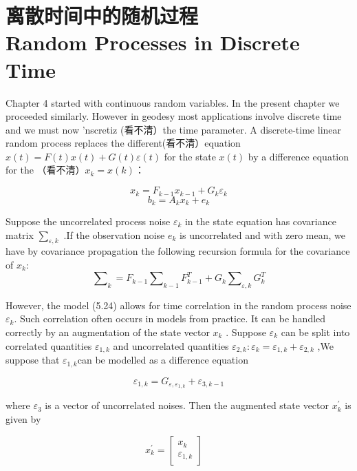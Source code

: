 \section[离散时间中的随机过程]{离散时间中的随机过程\\Random Processes in Discrete Time}
	Chapter 4 started with continuous random variables. In the present chapter we proceeded similarly. However in geodesy most applications involve discrete time and we must now 'nscretiz (看不清）the time parameter. A discrete-time linear random process replaces the different(看不清）equation $  x(t)=F(t)x(t)+G(t)\varepsilon(t)$ for the state $ x(t) $ by a difference equation for the （看不清）$ x_{k}=x(k) $：
	
	\[ x_{k}=F_{k-1}x_{k-1}+G_{k}\varepsilon_{k} \]
	\begin{equation}\label{5.24}
	 b_{k}=A_{k}x_{k}+e_{k}
	\end{equation}
 
	
	Suppose the uncorrelated process noise $ \varepsilon_{k} $ in the state equation has covariance matrix $\sum_{\varepsilon,k} $ .If the observation noise $ e_{k} $ is uncorrelated and with zero mean, we have by covariance propagation the following recursion formula for the covariance of $ x_{k} $:
	\begin{equation}\label{5.25}
	\sum\nolimits_{k}=F_{k-1}\sum\nolimits_{k-1}F_{k-1}^{T}+G_{k}\sum\nolimits_{\varepsilon,k}G_{k}^{T}
	\end{equation}
 
	
	However, the model (5.24) allows for time correlation in the random process noise $ \varepsilon_{k} $. Such correlation often occurs in models from practice. It can be handled correctly by an augmentation of the state vector $ x_{k} $ . Suppose $ \varepsilon_{k} $ can be split into correlated quantities $ \varepsilon_{1,k} $ and uncorrelated quantities $ \varepsilon_{2,k}: \varepsilon_{k} = \varepsilon_{1,k} + \varepsilon_{2,k} $ ,We suppose that $\varepsilon_{1,k} $can be modelled as a difference equation
	
	\[ \varepsilon_{1,k}=G_{\varepsilon,\varepsilon_{1,k}}+\varepsilon_{3,k-1} \]
	
	where $ \varepsilon_{3} $ is a vector of uncorrelated noises. Then the augmented state vector $ x_{k}^{'} $ is given by 
	
	\[ x_{k}^{'}=\begin{bmatrix} x_{k}  \\ \varepsilon_{1,k}\end{bmatrix} \quad \]
	
